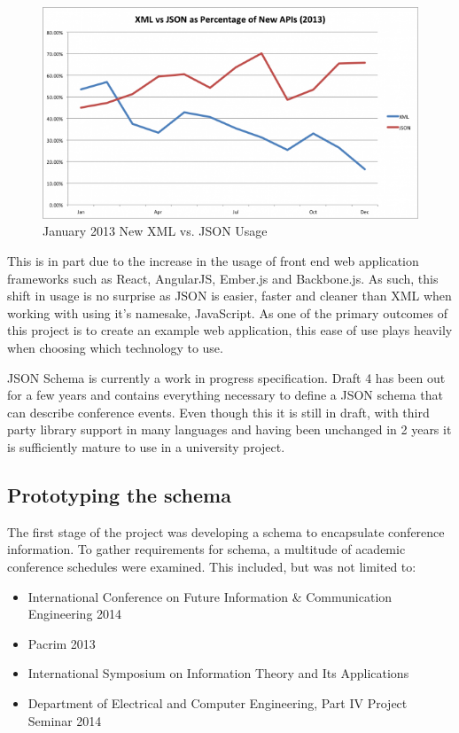 \documentclass[conference]{IEEEtran}
\begin{document}
\begin{figure}[h]
  \centering
  \includegraphics[scale=0.37]{images/xml_json_jan_2013.png}
  \caption{January 2013 New XML vs. JSON Usage\protect\cite{duvander2013json}}
  \label{fig:JSON_XML_jan_2013}
\end{figure}

This is in part due to the increase in the usage of front end web application frameworks such as React, AngularJS, Ember.js and Backbone.js. As such, this shift in usage is no surprise as JSON is easier, faster and cleaner \cite{hellstrom2012querying,lin2012comparison,nurseitov2009comparison} than XML when working with using it's namesake, JavaScript. As one of the primary outcomes of this project is to create an example web application, this ease of use plays heavily when choosing which technology to use.

JSON Schema \cite{galiegue2013json} is currently a work in progress specification. Draft 4 has been out for a few years and contains everything necessary to define a JSON schema that can describe conference events. Even though this it is still in draft, with third party library support in many languages \cite{galiegue2013inplementations} and having been unchanged in 2 years it is sufficiently mature to use in a university project.

\subsection{Prototyping the schema}
The first stage of the project was developing a schema to encapsulate conference information. To gather requirements for schema, a multitude of academic conference schedules were examined. This included, but was not limited to:
\begin{itemize}
\item International Conference on Future Information \& Communication Engineering 2014
\item Pacrim 2013
\item International Symposium on Information Theory and Its Applications
\item Department of Electrical and Computer Engineering, Part IV Project Seminar 2014
\end{itemize}
\end{document}
